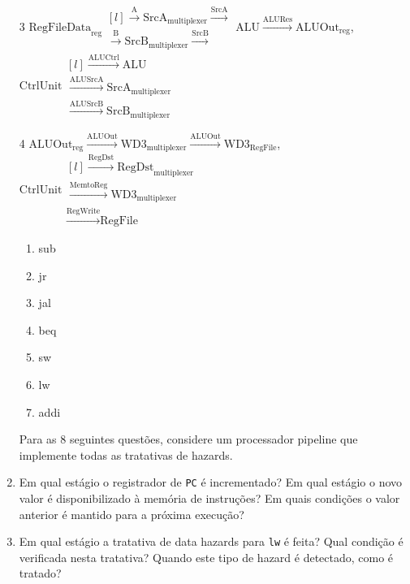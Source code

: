 \documentclass{article}
\begin{document}
\begin{enumerate}
3 $\text{RegFileData}_\text{reg} \begin{matrix*}[l] \xrightarrow{\text{A}} \text{SrcA}_\text{multiplexer} \xrightarrow{\text{SrcA}} \\ \xrightarrow{\text{B}} \text{SrcB}_\text{multiplexer} \xrightarrow{\text{SrcB}} \end{matrix*} \text{ALU} \xrightarrow{\text{ALURes}} \text{ALUOut}_\text{reg}$, $\text{CtrlUnit} \begin{matrix*}[l] 
\xrightarrow{\text{ALUCtrl}} \text{ALU} \\ \xrightarrow{\text{ALUSrcA}} \text{SrcA}_\text{multiplexer} \\ \xrightarrow{\text{ALUSrcB}} \text{SrcB}_\text{multiplexer} \end{matrix*}$\\

\bigbreak

4 $\text{ALUOut}_\text{reg} \xrightarrow{\text{ALUOut}} \text{WD3}_\text{multiplexer} \xrightarrow{\text{ALUOut}} \text{WD3}_\text{RegFile}$,  $\text{CtrlUnit} \begin{matrix*}[l] 
\xrightarrow{\text{RegDst}} \text{RegDst}_\text{multiplexer} \\ \xrightarrow{\text{MemtoReg}} \text{WD3}_\text{multiplexer} \\ \xrightarrow{\text{RegWrite}} \text{RegFile} \end{matrix*}$\\


\begin{enumerate}
    \item sub
    \item jr
    \item jal
    \item beq
    \item sw
    \item lw
    \item addi
\end{enumerate}

Para as 8 seguintes questões, considere um processador pipeline que implemente todas as tratativas de hazards.

\item Em qual estágio o registrador de \verb|PC| é incrementado? Em qual estágio o novo valor é disponibilizado à memória de instruções? Em quais condições o valor anterior é mantido para a próxima execução?

\item Em qual estágio a tratativa de data hazards para \verb|lw| é feita? Qual condição é verificada nesta tratativa? Quando este tipo de hazard é detectado, como é tratado?


\end{enumerate}
\end{document}

